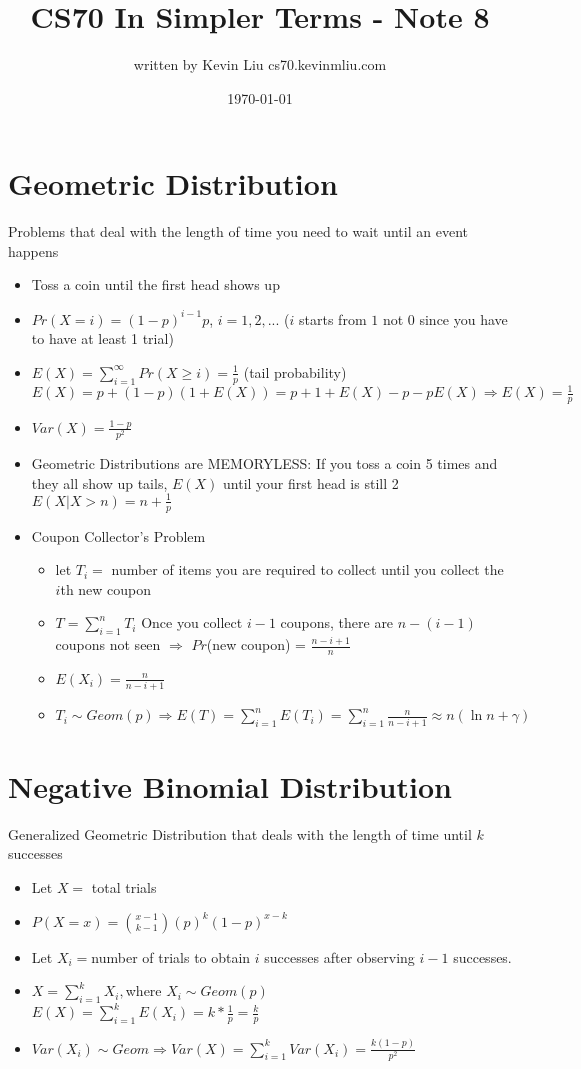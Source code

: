 \documentclass[a4paper]{article}
\title{CS70 In Simpler Terms - Note 8}
\author{written by Kevin Liu cs70.kevinmliu.com}
\date{\today}
\begin{document}
\maketitle

\section{Geometric Distribution}
Problems that deal with the length of time you need to wait until an event happens
\begin{itemize}
    \item Toss a coin until the first head shows up
    \item $Pr(X=i) = (1-p)^{i-1}p$, $i = 1,2,...$ ($i$ starts from $1$ not 0 since you have to have at least 1 trial)
    \item $E(X) = \sum_{i=1}^\infty Pr(X \geq i) = \frac{1}{p}$ (tail probability)\\
    $E(X) = p + (1-p)(1+E(X)) = p + 1 + E(X) -p -pE(X) \Rightarrow E(X) = \frac{1}{p}$
    \item $Var(X) = \frac{1-p}{p^2}$
    \item Geometric Distributions are MEMORYLESS: If you toss a coin 5 times and they all show up tails, $E(X)$ until your first head is still 2\\
    $E(X|X>n) = n + \frac{1}{p}$
    \item Coupon Collector's Problem
    \begin{itemize}
        \item let $T_i = $ number of items you are required to collect until you collect the $i$th new coupon
        \item $T = \sum_{i=1}^nT_i$ Once you collect $i - 1$ coupons, there are $n-(i-1)$ coupons not seen $\Rightarrow$ $Pr$(new coupon) = $\frac{n-i+1}{n}$
        \item $E(X_i) = \frac{n}{n-i+1}$
        \item $T_i \sim Geom(p) \Rightarrow E(T) = \sum_{i=1}^nE(T_i) = \sum_{i=1}^n\frac{n}{n-i+1} \approx n(\ln n + \gamma)$
    \end{itemize}
\end{itemize}

\section{Negative Binomial Distribution}
Generalized Geometric Distribution that deals with the length of time until $k$ successes
\begin{itemize}
    \item Let $X = $ total trials
    \item $P(X=x) = \binom{x-1}{k-1}(p)^{k}(1-p)^{x-k}$ 
    \item Let $X_i = $number of trials to obtain $i$ successes after observing $i-1$ successes.
    \item $X = \sum_{i=1}^kX_i, $where $X_i \sim Geom(p)$\\
    $E(X) = \sum_{i=1}^kE(X_i) = k*\frac{1}{p} = \frac{k}{p}$
    \item $Var(X_i) \sim Geom \Rightarrow Var(X) = \sum_{i = 1}^kVar(X_i) = \frac{k(1-p)}{p^2}$
\end{itemize}
\end{document}

